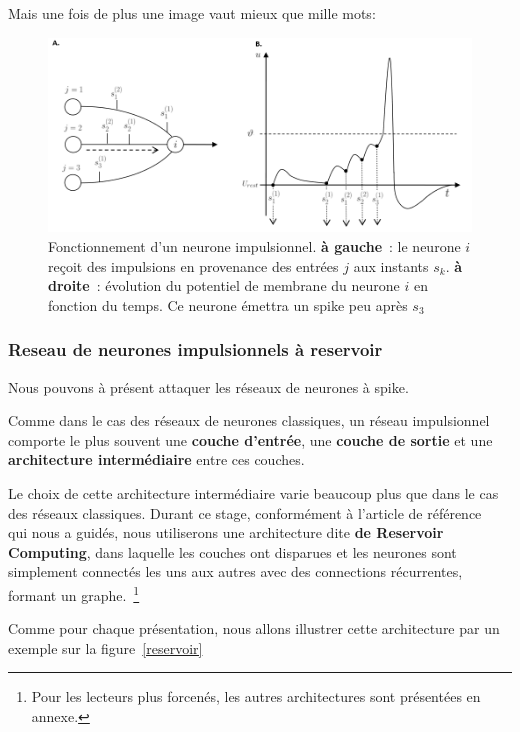 Mais une fois de plus une image vaut mieux que mille mots:\newline

\begin{figure}[h]
  \begin{center}
\includegraphics[width=12cm]{./images/image9.png}
\end{center}
\caption{Fonctionnement d'un neurone impulsionnel. \textbf{à gauche}~: le neurone $i$ reçoit des impulsions en provenance des entrées $j$ aux instants $s_k$. \textbf{à droite}~: évolution du potentiel de membrane du neurone $i$ en fonction du temps. Ce neurone émettra un spike peu après $s_3$}
\label{NeuroneASpike}
\end{figure}

\subsubsection{Reseau de neurones impulsionnels à reservoir}

Nous pouvons à présent attaquer les réseaux de neurones à spike.

Comme dans le cas des réseaux de neurones classiques, un réseau impulsionnel comporte le plus souvent une \textbf{couche d'entrée}, une \textbf{couche de sortie} et une \textbf{architecture intermédiaire} entre ces couches.

Le choix de cette architecture intermédiaire varie beaucoup plus que dans le cas des réseaux classiques. Durant ce stage, conformément à l'article de référence~\cite{Lympero} qui nous a guidés, nous utiliserons une architecture dite \textbf{de Reservoir Computing}, dans laquelle les couches ont disparues et les neurones sont simplement connectés les uns aux autres avec des connections récurrentes, formant un graphe.~\footnote{Pour les lecteurs plus forcenés, les autres architectures sont présentées en annexe.}

Comme pour chaque présentation, nous allons illustrer cette architecture par un exemple sur la figure~\ref{reservoir}

